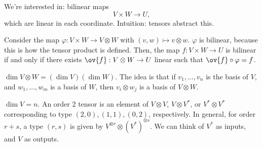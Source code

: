 We're interested in: bilinear maps 
\[V\times W\rightarrow U,\]
which are linear in each coordinate. Intuition: tensors abstract this. 

Consider the map $\varphi: V\times W\rightarrow V\otimes W$ with $(v,w)\mapsto v\otimes w$. $\varphi$ is bilinear, because this is how the tensor product is defined. Then, the map $f: V\times W\rightarrow U$ is bilinear if and only if there exists $\ov{f} : V\otimes W\rightarrow U$ linear such that $\ov{f}\circ \varphi = f$. 

\begin{center}
\end{center}

$\dim V\otimes W = (\dim V)(\dim W)$. The idea is that if $v_1, \hdots, v_n$ is the basis of $V$, and $w_1, \hdots, w_m$ is a basis of $W$, then $v_i\otimes w_j$ is a basis of $V\otimes W$. 

$\dim V = n$. An order $2$ tensor is an element of $V\otimes V$, $V\otimes V^*$, or $V^*\otimes V^*$ corresponding to type $(2,0),(1,1),(0,2)$, respectively. In general, for order $r+s$, a type $(r,s)$ is given by $V^{\otimes r}\otimes (V^*)^{\otimes s}$. We can think of $V^*$ as inputs, and $V$ as outputs. 



